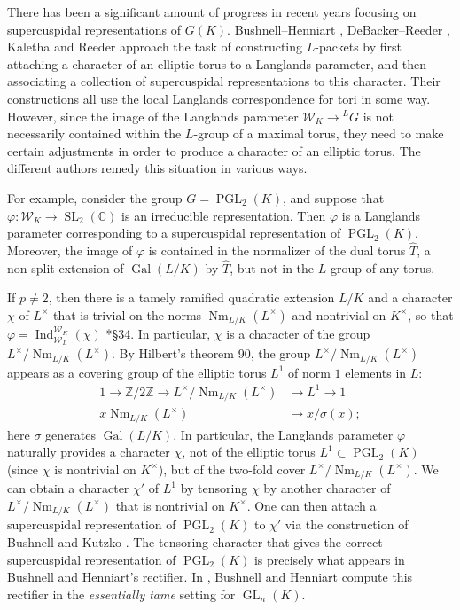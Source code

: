 \documentclass{mrlart7}
\theoremstyle{plain}
\theoremstyle{definition}
\numberwithin{equation}{section}
\DeclareMathOperator{\Gal}{Gal}
\DeclareMathOperator{\Nm}{Nm}
\DeclareMathOperator{\Ind}{Ind}
\DeclareMathOperator{\GL}{GL}
\DeclareMathOperator{\PGL}{PGL}
\DeclareMathOperator{\SL}{SL}
\newcommand{\CC}{\mathbb{C}}
\newcommand{\Kx}{K^\times}
\newcommand{\Lx}{L^\times}
\newcommand{\Weil}{\mathcal{W}}
\begin{document}
There has been a significant amount of progress in recent years
focusing on supercuspidal representations of $G(K)$.  Bushnell--Henniart \cite{bushnell-henniart:10a},
DeBacker--Reeder \cite{reeder-debacker:09a}, Kaletha \cite{kaletha:13a} and Reeder \cite{reeder:08a}
approach the task of constructing $L$-packets by first attaching
a character of an elliptic torus to a Langlands parameter, and
then associating a collection of supercuspidal representations to this character.
Their constructions all use the local Langlands correspondence for tori in some way.  However,
since the image of the Langlands parameter $\Weil_K \rightarrow {}^L G$ is not
necessarily contained within the $L$-group of a maximal torus, they need to make certain
adjustments in order to produce a character of an elliptic torus.  The different authors remedy this situation in various ways.

For example, consider the group $G = \PGL_{2}(K)$, and suppose that
$\varphi : \Weil_K \rightarrow \SL_{2}(\CC)$ is an
irreducible representation.  Then $\varphi$ is a Langlands parameter corresponding
to a supercuspidal representation of $\PGL_2(K)$.  Moreover, the image of $\varphi$
is contained in the normalizer of the dual torus $\hat{T}$, a non-split
extension of $\Gal(L/K)$ by $\hat{T}$, but not in the $L$-group of any torus.

If $p \neq 2$, then there is a tamely ramified quadratic
extension $L/K$ and a character
$\chi$ of $\Lx$ that is trivial on the norms $\Nm_{L/K}(\Lx)$ and nontrivial on $\Kx$, so that
$\varphi = \Ind_{\Weil_L}^{\Weil_K}(\chi)$ \cite{bushnell-henniart:06a}*{\S 34}.  In particular, $\chi$ is a character of the group $\Lx / \Nm_{L/K}(\Lx)$.
By Hilbert's theorem 90, the group $\Lx / \Nm_{L/K}(\Lx)$ appears as a covering group of the elliptic torus $L^1$ of norm $1$ elements in $L$:
\begin{align*}
1 \rightarrow \mathbb{Z} / 2 \mathbb{Z} \rightarrow \Lx / \Nm_{L/K}(\Lx) &\rightarrow L^1 \rightarrow 1 \\
x \Nm_{L/K}(L^{\times}) &\mapsto x / \sigma(x);
\end{align*}
here $\sigma$ generates $\Gal(L/K)$.  In particular, the Langlands parameter
$\varphi$ naturally provides a character $\chi$, not of the elliptic torus
$L^1 \subset \PGL_2(K)$ (since $\chi$ is nontrivial on $\Kx$),
but of the two-fold cover $\Lx / \Nm_{L/K}(\Lx)$.  We can obtain a character $\chi'$ of $L^1$
by tensoring $\chi$ by another character of
$\Lx / \Nm_{L/K}(\Lx)$ that is nontrivial on $\Kx$.  One can then attach a supercuspidal representation
of $\PGL_2(K)$ to $\chi'$ via the construction of Bushnell and Kutzko \cite{bushnell-kutzko:AdmissibleDual}.
The tensoring character that gives the correct supercuspidal representation of $\PGL_2(K)$
is precisely what appears in Bushnell and Henniart's rectifier.  In \cite{bushnell-henniart:10a},
Bushnell and Henniart compute this rectifier in the \emph{essentially tame} setting for $\GL_n(K)$.
\end{document}
